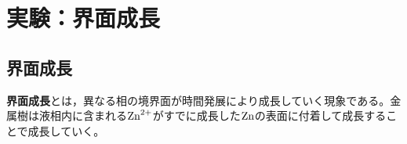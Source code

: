 \documentclass[autodetect-engine,dvi=dvipdfmx,a4paper,ja=standard,oneside,openany,11pt,draft]{bxjsbook}
\begin{document}
\chapter{実験：界面成長}
\section{界面成長}
\textbf{界面成長}とは，異なる相の境界面が時間発展により成長していく現象である。金属樹は液相内に含まれる$\ce{Zn^{2+}}$がすでに成長した$\ce{Zn}$の表面に付着して成長することで成長していく。

\ifdraft{
  
  
}{}
\end{document}
